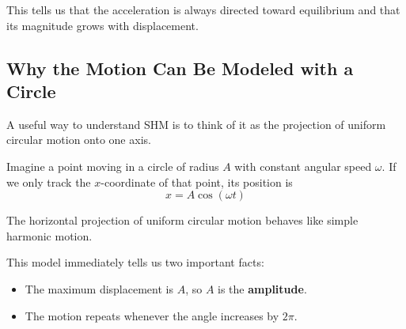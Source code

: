 This tells us that the acceleration is always directed toward equilibrium and that its magnitude grows with displacement.

\subsection*{Why the Motion Can Be Modeled with a Circle}
A useful way to understand SHM is to think of it as the projection of uniform circular motion onto one axis.

Imagine a point moving in a circle of radius $A$ with constant angular speed $\omega$. If we only track the $x$-coordinate of that point, its position is
\begin{equation}
    x = A\cos(\omega t)
\end{equation}

\begin{center}

\small The horizontal projection of uniform circular motion behaves like simple harmonic motion.
\end{center}

This model immediately tells us two important facts:
\begin{itemize}
    \item The maximum displacement is $A$, so $A$ is the \textbf{amplitude}.
    \item The motion repeats whenever the angle increases by $2\pi$.
\end{itemize}

